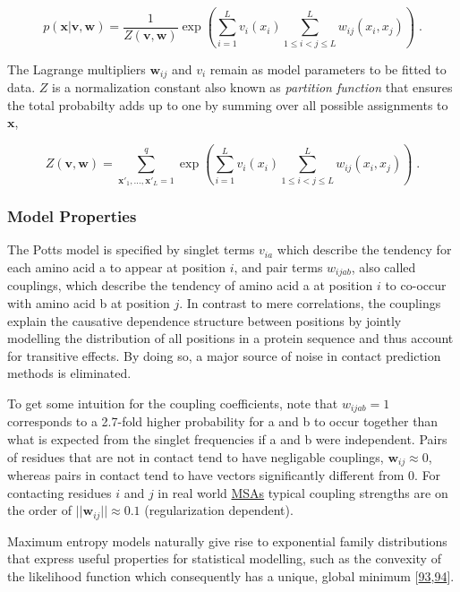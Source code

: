 \documentclass[11pt,a4paper,twoside]{book}
\newcommand{\seq}{\mathbf{x}}
\renewcommand{\v}{\mathbf{v}}
\newcommand{\vi}{v_{i}}
\newcommand{\via}{v_{ia}}
\newcommand{\w}{\mathbf{w}}
\newcommand{\wij}{\mathbf{w}_{ij}}
\newcommand{\wijab}{w_{ijab}}
\theoremstyle{definition}
\theoremstyle{definition}
\theoremstyle{remark}
\begin{document}
\begin{equation}
    p(\seq | \v, \w ) = \frac{1}{Z(\v, \w)} \exp \left( \sum_{i=1}^L v_i(x_i) \sum_{1 \leq i < j \leq L}^L w_{ij}(x_i, x_j) \right) \; .
\label{eq:max-ent-model}
\end{equation}

The Lagrange multipliers \(\wij\) and \(\vi\) remain as model parameters
to be fitted to data. \(Z\) is a normalization constant also known as
\emph{partition function} that ensures the total probabilty adds up to
one by summing over all possible assignments to \(\seq\),

\begin{equation}
  Z(\v, \w) = \sum_{\seq\prime_1, \ldots, \seq\prime_L = 1}^{q} \exp  \left( \sum_{i=1}^L v_i(x_i) \sum_{1 \leq i < j \leq L}^L w_{ij}(x_i, x_j) \right) \; .
  \label{eq:partition-fct-likelihood}
\end{equation}

\subsubsection{Model Properties}\label{potts-model-properties}

The Potts model is specified by singlet terms \(\via\) which describe
the tendency for each amino acid a to appear at position \(i\), and pair
terms \(\wijab\), also called couplings, which describe the tendency of
amino acid a at position \(i\) to co-occur with amino acid b at position
\(j\). In contrast to mere correlations, the couplings explain the
causative dependence structure between positions by jointly modelling
the distribution of all positions in a protein sequence and thus account
for transitive effects. By doing so, a major source of noise in contact
prediction methods is eliminated.

To get some intuition for the coupling coefficients, note that
\(\wijab = 1\) corresponds to a 2.7-fold higher probability for a and b
to occur together than what is expected from the singlet frequencies if
a and b were independent. Pairs of residues that are not in contact tend
to have negligable couplings, \(\wij \approx 0\), whereas pairs in
contact tend to have vectors significantly different from 0. For
contacting residues \(i\) and \(j\) in real world
\protect\hyperlink{abbrev}{MSAs} typical coupling strengths are on the
order of \(||\wij || \approx 0.1\) (regularization dependent).

Maximum entropy models naturally give rise to exponential family
distributions that express useful properties for statistical modelling,
such as the convexity of the likelihood function which consequently has
a unique, global minimum
{[}\protect\hyperlink{ref-Wainwright2007}{93},\protect\hyperlink{ref-Murphy2012}{94}{]}.
\end{document}
